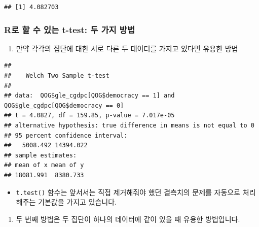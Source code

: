 \documentclass[]{book}
\newenvironment{Shaded}{\begin{snugshade}}{\end{snugshade}}
\newcommand{\DecValTok}[1]{\textcolor[rgb]{0.00,0.00,0.81}{#1}}
\newcommand{\KeywordTok}[1]{\textcolor[rgb]{0.13,0.29,0.53}{\textbf{#1}}}
\newcommand{\NormalTok}[1]{#1}
\newcommand{\OperatorTok}[1]{\textcolor[rgb]{0.81,0.36,0.00}{\textbf{#1}}}
\newcommand{\StringTok}[1]{\textcolor[rgb]{0.31,0.60,0.02}{#1}}
\providecommand{\tightlist}{%
  \setlength{\itemsep}{0pt}\setlength{\parskip}{0pt}}
\begin{document}
\begin{verbatim}
## [1] 4.082703
\end{verbatim}

\hypertarget{ruxb85c-uxd560-uxc218-uxc788uxb294-t-test-uxb450-uxac00uxc9c0-uxbc29uxbc95}{%
\subsubsection{\texorpdfstring{\textbf{R}로 할 수 있는 t-test: 두 가지 방법}{R로 할 수 있는 t-test: 두 가지 방법}}\label{ruxb85c-uxd560-uxc218-uxc788uxb294-t-test-uxb450-uxac00uxc9c0-uxbc29uxbc95}}

\begin{enumerate}
\def\labelenumi{\arabic{enumi}.}
\tightlist
\item
  만약 각각의 집단에 대한 서로 다른 두 데이터를 가지고 있다면 유용한 방법
\end{enumerate}

\begin{Shaded}
\end{Shaded}

\begin{verbatim}
## 
##    Welch Two Sample t-test
## 
## data:  QOG$gle_cgdpc[QOG$democracy == 1] and QOG$gle_cgdpc[QOG$democracy == 0]
## t = 4.0827, df = 159.85, p-value = 7.017e-05
## alternative hypothesis: true difference in means is not equal to 0
## 95 percent confidence interval:
##   5008.492 14394.022
## sample estimates:
## mean of x mean of y 
## 18081.991  8380.733
\end{verbatim}

\begin{itemize}
\tightlist
\item
  \texttt{t.test()} 함수는 앞서서는 직접 제거해줘야 했던 결측치의 문제를 자동으로 처리해주는 기본값을 가지고 있습니다.
\end{itemize}

\begin{enumerate}
\def\labelenumi{\arabic{enumi}.}
\setcounter{enumi}{1}
\tightlist
\item
  두 번째 방법은 두 집단이 하나의 데이터에 같이 있을 때 유용한 방법입니다.
\end{enumerate}
\end{document}
